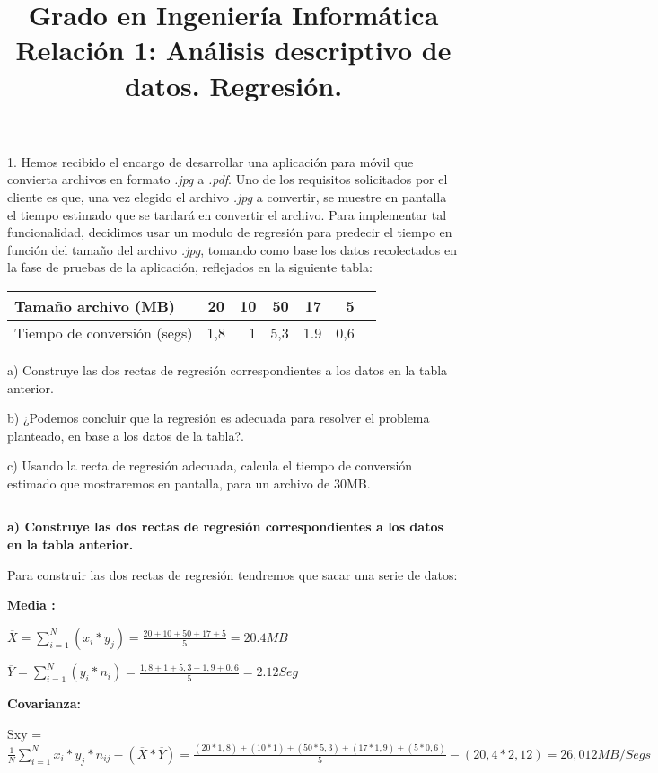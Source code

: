 \documentclass{article}
\title{Grado en Ingenier\'ia Inform\'atica
	Relaci\'on 1: An\'alisis descriptivo de datos. Regresi\'on.}
\begin{document}
\maketitle

1. Hemos recibido el encargo de desarrollar una aplicaci\'on para m\'ovil que convierta archivos en formato \textit{.jpg} a  \textit{.pdf}. Uno de los requisitos solicitados por el cliente es que, una vez elegido el archivo \textit{.jpg} a convertir, se muestre en pantalla el tiempo estimado que se tardar\'a en convertir el archivo. Para implementar tal funcionalidad, decidimos usar un modulo de regresi\'on para predecir el tiempo en funci\'on del tamaño del archivo \textit{.jpg}, tomando como base los datos recolectados en la fase de pruebas de la aplicaci\'on, reflejados en la siguiente tabla:

\begin{tabular}{|l|c|r|r|r|r|r}
Tamaño archivo (MB)  & 20 & 10 & 50 & 17 & 5\\
\hline
Tiempo de conversi\'on (segs) & 1,8 & 1 & 5,3 & 1.9 & 0,6\\
\end{tabular}

a) Construye las dos rectas de regresi\'on correspondientes a los datos en la tabla anterior.

b) ¿Podemos concluir que la regresi\'on es adecuada para resolver el problema planteado, en base a los datos de la tabla?.

c) Usando la recta de regresi\'on adecuada, calcula el tiempo de conversi\'on estimado que mostraremos en pantalla, para un archivo de 30MB.

\rule{119mm}{0.2mm}

\textbf{a) Construye las dos rectas de regresi\'on correspondientes a los datos en la tabla anterior.}

Para construir las dos rectas de regresi\'on tendremos que sacar una serie de datos:

\textbf{Media :} 


 \(\overline{X} = \displaystyle\sum_{i=1}^{N}(x_i  * y_j) = \frac{20 + 10 +50 +17 +5}{5} = 20.4MB\)

\(\overline{Y} = \displaystyle\sum_{i=1}^ {N}(y_i * n_i) = \frac{1,8 + 1 + 5,3 + 1,9 + 0,6}{5} = 2.12 Seg\)

\textbf{Covarianza:}

Sxy = \(\frac{1}{N} \displaystyle\sum_{i=1}^ {N} x_{i} * y_{j} * n_{ij} - (\overline{X} * \overline{Y}) = \frac{(20 * 1,8) + (10 * 1) + (50 * 5,3) + (17 * 1,9) + (5 * 0,6)} {5} - (20,4 * 2,12) = 26,012 MB/Segs\)
\end{document}
